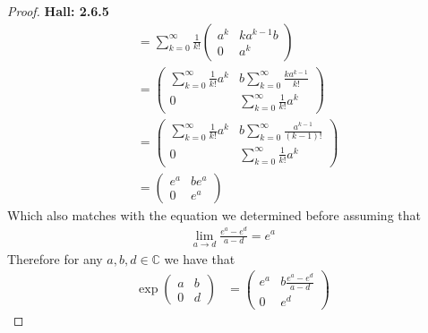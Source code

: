 \documentclass[11pt]{article}
\newcommand{\C}{\mathbb{C}}
\theoremstyle{definition}
\begin{document}
\begin{proof}{\textbf{Hall: 2.6.5}}
\begin{align*}
        &= \sum_{k=0}^\infty\frac{1}{k!}
        \begin{pmatrix} a^k & ka^{k-1}b\\ 0 & a^k\end{pmatrix}\\
        &= \begin{pmatrix}
            \sum_{k=0}^\infty\frac{1}{k!} a^k &
            b\sum_{k=0}^\infty\frac{ka^{k-1}}{k!}\\
            0 & \sum_{k=0}^\infty\frac{1}{k!} a^k
        \end{pmatrix}\\
        &= \begin{pmatrix}
            \sum_{k=0}^\infty\frac{1}{k!} a^k &
            b\sum_{k=0}^\infty\frac{a^{k-1}}{(k - 1)!}\\
            0 & \sum_{k=0}^\infty\frac{1}{k!} a^k
        \end{pmatrix}\\
        &= \begin{pmatrix}e^a & be^a\\ 0 & e^a\end{pmatrix}
    \end{align*}
    Which also matches with the equation we determined before assuming that
    \begin{align*}
        \lim_{a\to d}\frac{e^a - e^d}{a - d} = e^a
    \end{align*}
    Therefore for any $a,b,d \in \C$ we have that
    \begin{align*}
        \exp\begin{pmatrix} a & b\\ 0 & d\end{pmatrix}
        &= \begin{pmatrix}e^a & b\frac{e^a - e^d}{a - d}\\ 0 & e^d\end{pmatrix}
    \end{align*}
\end{proof}
\cleardoublepage
\end{document}
